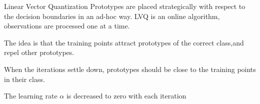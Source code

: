 \documentclass{beamer}
\begin{document}
\begin{frame}
\centering

\end{frame}

\begin{frame}{Linear Vector Quantization}
Prototypes are placed strategically with respect to the decision boundaries in an ad-hoc way. LVQ is an online algorithm, observations are processed one at a time.


The idea is that the training points attract prototypes of the correct class,and repel other prototypes.

 When the iterations settle down, prototypes should be close to the training points in their class. 
 
 The learning rate $\alpha$ is decreased to zero with each iteration
\end{frame}
\end{document}
